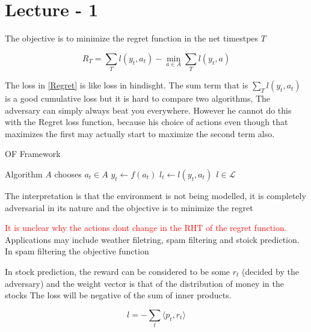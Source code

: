 \section{Lecture - 1}


The objective is to minimize the regret function in the net timestpes $T$

\begin{equation}
    \label{Regret}
    R_T  = \sum_T l(y_t, a_t)  - \min_{a \in A} \sum_T l(y_t, a)
\end{equation}

The loss in \ref{Regret} is like loss in hindisght.
The sum term that is $\sum_T l(y_t, a_t)$ is a good cumulative loss but it is hard to compare two algorithms, 
The adversary can simply always beat you everywhere. However he cannot do this with the Regret loss function, because his choice
of actions even though that maximizes the first may actually start to maximize the second term also.

\begin{algorithm}
    \caption{OF Framework}
    \begin{algorithmic}[1]
            \State Algorithm $A$ chooses $a_t \in A$
            \State $y_t \gets f(a_t)$
            \State $l_t \gets l(y_t, a_t) \ \ l \in \mathcal{L}$ 
        \EndFor
    \end{algorithmic}
\end{algorithm}


The interpretation is that the environment is not being modelled, it is completely adversarial in its nature
and the objective is to minimize the regret

\textcolor{red}{It is unclear why the actions dont change in the RHT of the regret function.}
Applications may include weather filetring, spam filtering and stoick prediction.
In spam filtering the objective function

In stock prediction, the reward can be considered to be some $r_t$ (decided by the adversary) and the weight vector is that of the distribution of money in the stocks
The loss will be negative of the sum of inner products.

\begin{equation}
    \label{stock}
    l = - \sum_t \langle p_t ,r_t \rangle
\end{equation}



